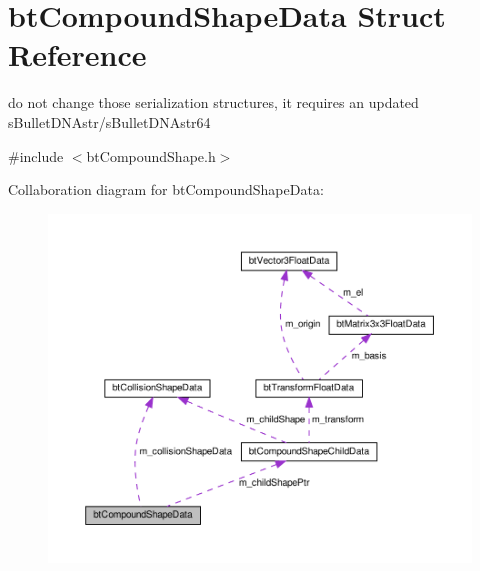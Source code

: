\hypertarget{structbtCompoundShapeData}{}\section{bt\+Compound\+Shape\+Data Struct Reference}
\label{structbtCompoundShapeData}


do not change those serialization structures, it requires an updated s\+Bullet\+D\+N\+Astr/s\+Bullet\+D\+N\+Astr64  




{\ttfamily \#include $<$bt\+Compound\+Shape.\+h$>$}



Collaboration diagram for bt\+Compound\+Shape\+Data\+:
\nopagebreak
\begin{figure}[H]
\begin{center}
\leavevmode
\includegraphics[width=350pt]{structbtCompoundShapeData__coll__graph}
\end{center}
\end{figure}

